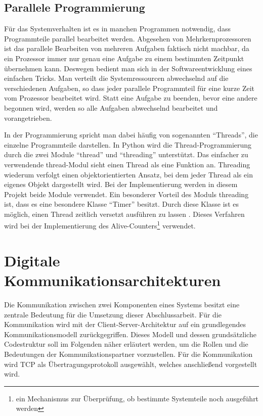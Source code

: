 \documentclass[12pt,a4paper]{report}
\begin{document}
\subsection{Parallele Programmierung}
Für das Systemverhalten ist es in manchen Programmen notwendig, dass Programmteile parallel bearbeitet werden. Abgesehen von Mehrkernprozessoren ist das parallele Bearbeiten von mehreren Aufgaben faktisch nicht machbar, da ein Prozessor immer nur genau eine Aufgabe zu einem bestimmten Zeitpunkt übernehmen kann. Deswegen bedient man sich in der Softwareentwicklung eines einfachen Tricks. Man verteilt die Systemressourcen abwechselnd auf die verschiedenen Aufgaben, so dass jeder parallele Programmteil für eine kurze Zeit vom Prozessor bearbeitet wird. Statt eine Aufgabe zu beenden, bevor eine andere begonnen wird, werden so alle Aufgaben abwechselnd bearbeitet und vorangetrieben.

In der Programmierung spricht man dabei häufig von sogenannten "`Threads"', die einzelne Programmteile darstellen. In Python wird die Thread-Programmierung durch die zwei Module "`thread"' und "`threading"' unterstützt. Das einfacher zu verwendende thread-Modul sieht einen Thread als eine Funktion an. Threading wiederum verfolgt einen objektorientierten Ansatz, bei dem jeder Thread als ein eigenes Objekt dargestellt wird. Bei der Implementierung werden in diesem Projekt beide Module verwendet. Ein besonderer Vorteil des Moduls threading ist, dass es eine besondere Klasse "`Timer"' besitzt. Durch diese Klasse ist es möglich, einen Thread zeitlich versetzt ausführen zu lassen \cite{GalileoPython}. Dieses Verfahren wird bei der Implementierung des Alive-Counters\footnote{ein Mechanismus zur Überprüfung, ob bestimmte Systemteile noch ausgeführt werden} verwendet.
\section{Digitale Kommunikationsarchitekturen}\label{sec:Digitale Kommunikationsarchitekturen}
Die Kommunikation zwischen zwei Komponenten eines Systems besitzt eine zentrale Bedeutung für die Umsetzung dieser Abschlussarbeit. Für die Kommunikation wird mit der Client-Server-Architektur auf ein grundlegendes Kommunikationsmodell zurückgegriffen. Dieses Modell und dessen grundsätzliche Codestruktur soll im Folgenden näher erläutert werden, um die Rollen und die Bedeutungen der Kommunikationspartner vorzustellen. Für die Kommunikation wird TCP als Übertragungsprotokoll ausgewählt, welches anschlie\ss end vorgestellt wird.
\end{document}

